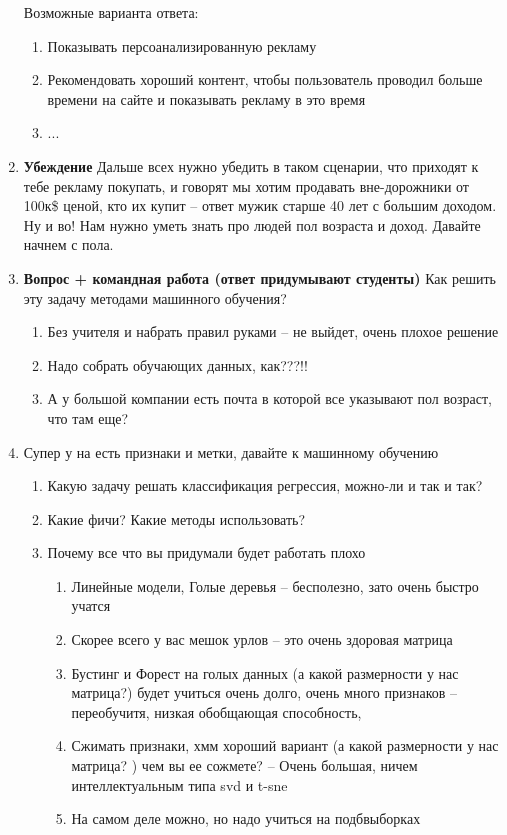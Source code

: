 \documentclass[a4paper, 12pt]{article}
\begin{document}
\begin{enumerate}
Возможные варианта ответа:
\begin{enumerate}
	\item Показывать персоанализированную рекламу
	\item Рекомендовать хороший контент, чтобы пользователь проводил больше времени на сайте и показывать рекламу в это время
	\item ...
\end{enumerate}
\item \textbf{Убеждение} Дальше всех нужно убедить в таком сценарии, что приходят к тебе рекламу покупать, и говорят мы хотим продавать вне-дорожники от 100к\$ ценой, кто их купит -- ответ мужик старше 40 лет с большим доходом. Ну и во! Нам нужно уметь знать про людей пол возраста и доход. Давайте начнем с пола.
\item  \textbf{Вопрос + командная работа (ответ придумывают студенты)} Как решить эту задачу методами машинного обучения?
\begin{enumerate}
	\item Без учителя и набрать правил руками -- не выйдет, очень плохое решение
	\item Надо собрать обучающих данных, как???!!
	\item А у большой компании есть почта в которой все указывают пол возраст, что там еще?
\end{enumerate}
\item Супер у на есть признаки и метки, давайте к машинному обучению
\begin{enumerate}
	\item Какую задачу решать классификация регрессия, можно-ли и так и так?
	\item Какие фичи? Какие методы использовать? 
	\item Почему все что вы придумали будет работать плохо
	\begin{enumerate}
		\item Линейные модели, Голые деревья -- бесполезно, зато очень быстро учатся
		\item Скорее всего у вас мешок урлов -- это очень здоровая матрица
		\item Бустинг и Форест  на голых данных (а какой размерности у нас матрица?) будет учиться очень долго, очень много признаков -- переобучитя, низкая обобщающая способность,
		\item Сжимать признаки, хмм хороший вариант (а какой размерности у нас матрица? ) чем вы ее сожмете? -- Очень большая, ничем интеллектуальным типа svd и t-sne 
		\item На самом деле можно, но надо учиться на подбвыборках 

\end{enumerate}
\end{enumerate}
\end{enumerate}
\end{document}
